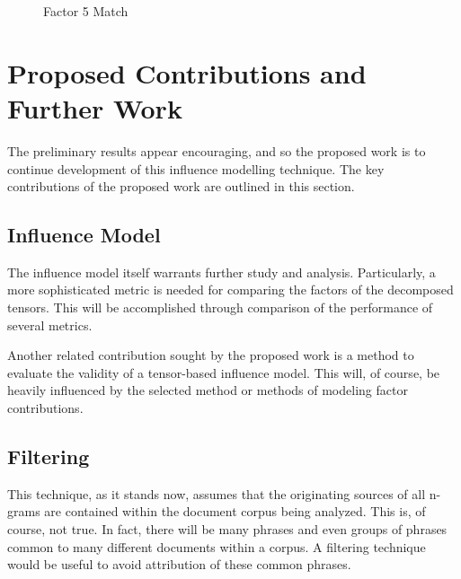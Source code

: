 \documentclass{article}
\begin{document}
\begin{figure}%
    \centering
    \qquad
    \caption{Factor 5 Match}%
    \label{fig:com5}%
\end{figure}

\section{Proposed Contributions and Further Work}
The preliminary results appear encouraging, and so the proposed work
is to continue development of this influence modelling technique.  The
key contributions of the proposed work are outlined in this section.

\subsection{Influence Model}
The influence model itself warrants further study and analysis.
Particularly, a more sophisticated metric is needed for comparing the
factors of the decomposed tensors.  This will be accomplished through
comparison of the performance of several metrics.

Another related contribution sought by the proposed work is a method
to evaluate the validity of a tensor-based influence model.  This
will, of course, be heavily influenced by the selected method or
methods of modeling factor contributions.

\subsection{Filtering}
This technique, as it stands now, assumes that the originating sources
of all n-grams are contained within the document corpus being
analyzed. This is, of course, not true.  In fact, there will be many
phrases and even groups of phrases common to many different documents
within a corpus.  A filtering technique would be useful to avoid
attribution of these common phrases.
\end{document}
